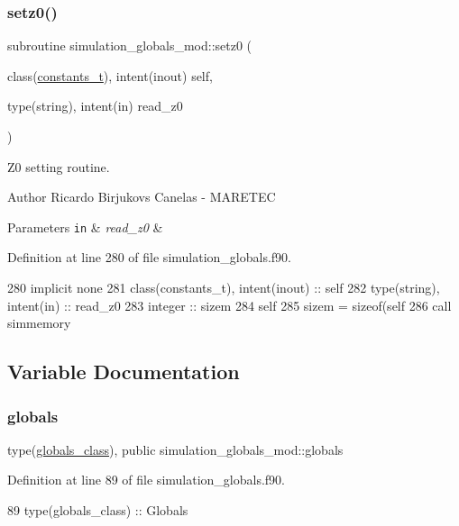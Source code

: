 \subsubsection{\texorpdfstring{setz0()}{setz0()}}
{\footnotesize\ttfamily subroutine simulation\+\_\+globals\+\_\+mod\+::setz0 (\begin{DoxyParamCaption}\item[{class(\mbox{\hyperlink{structsimulation__globals__mod_1_1constants__t}{constants\+\_\+t}}), intent(inout)}]{self,  }\item[{type(string), intent(in)}]{read\+\_\+z0 }\end{DoxyParamCaption})\hspace{0.3cm}{\ttfamily [private]}}



Z0 setting routine. 

\begin{DoxyAuthor}{Author}
Ricardo Birjukovs Canelas -\/ M\+A\+R\+E\+T\+EC
\end{DoxyAuthor}

\begin{DoxyParams}[1]{Parameters}
\mbox{\tt in}  & {\em read\+\_\+z0} & \\
\hline
\end{DoxyParams}


Definition at line 280 of file simulation\+\_\+globals.\+f90.


\begin{DoxyCode}
280     \textcolor{keywordtype}{implicit none}
281     \textcolor{keywordtype}{class}(constants\_t), \textcolor{keywordtype}{intent(inout)} :: self
282     \textcolor{keywordtype}{type}(string), \textcolor{keywordtype}{intent(in)} :: read\_z0
283     \textcolor{keywordtype}{integer} :: sizem
284     self%
285     sizem = sizeof(self%
286     \textcolor{keyword}{call }simmemory%
\end{DoxyCode}


\subsection{Variable Documentation}
\mbox{\label{namespacesimulation__globals__mod_a04123075b6de525703edb89697fc39e9}} 
\subsubsection{\texorpdfstring{globals}{globals}}
{\footnotesize\ttfamily type(\mbox{\hyperlink{structsimulation__globals__mod_1_1globals__class}{globals\+\_\+class}}), public simulation\+\_\+globals\+\_\+mod\+::globals}



Definition at line 89 of file simulation\+\_\+globals.\+f90.


\begin{DoxyCode}
89     \textcolor{keywordtype}{type}(globals\_class) :: Globals
\end{DoxyCode}
